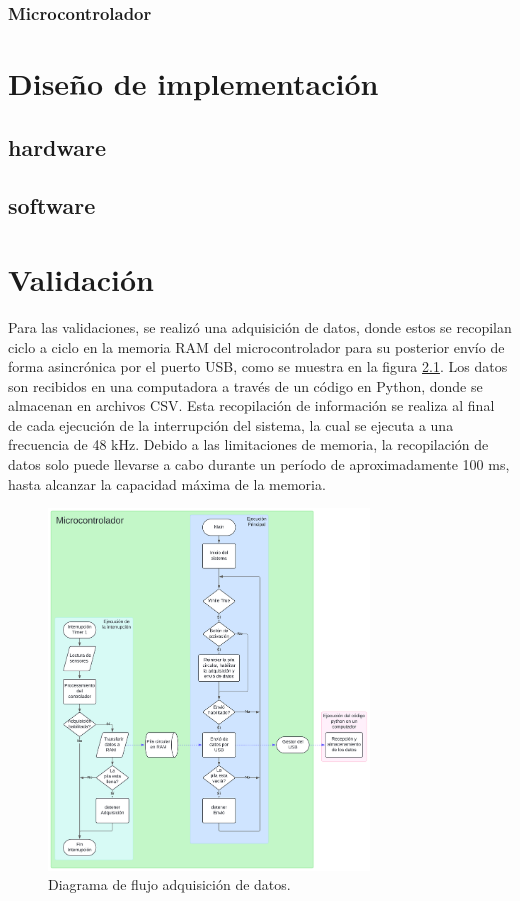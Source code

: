 \documentclass[11pt]{report}
\begin{document}
\subsection{Microcontrolador}


\chapter{Diseño de implementación}
\section{hardware}
\section{software}

\chapter{Validación}
Para las validaciones, se realizó una adquisición de datos, donde estos se recopilan ciclo a ciclo en la memoria RAM del microcontrolador para su posterior envío de forma asincrónica por el puerto USB, como se muestra en la figura \ref{flujo_debug}. Los datos son recibidos en una computadora a través de un código en Python, donde se almacenan en archivos CSV. Esta recopilación de información se realiza al final de cada ejecución de la interrupción del sistema, la cual se ejecuta a una frecuencia de 48 kHz. Debido a las limitaciones de memoria, la recopilación de datos solo puede llevarse a cabo durante un período de aproximadamente 100 ms, hasta alcanzar la capacidad máxima de la memoria.

\begin{figure}[ht]
	\centering
	\includegraphics[width=0.76\textwidth]{imagenes/Debug USB.png}
	\caption{Diagrama de flujo adquisición de datos.}
	\label{flujo_debug}
\end{figure}
\FloatBarrier
\end{document}
